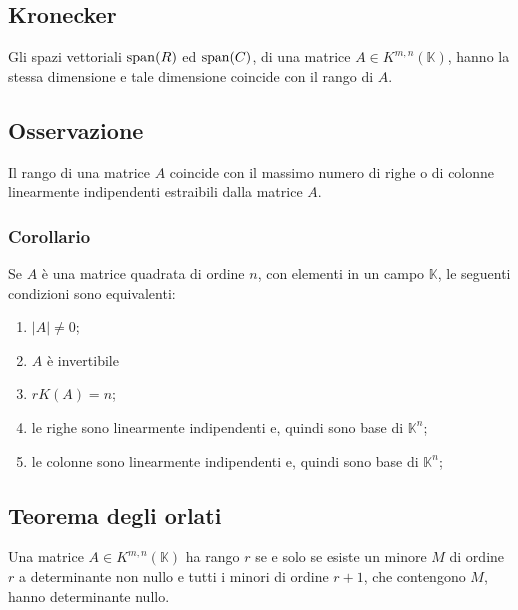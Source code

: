 \documentclass[../main.tex]{subfiles}
\begin{document}
\subsection{Kronecker}
Gli spazi vettoriali $\operatorname{span}(R)$ ed $\operatorname{span}(C)$, di una matrice $A\in K^{m,n}
    (\mathbb{K})$, hanno la stessa dimensione e tale dimensione coincide con il
rango di $A$.

\subsection{Osservazione}
Il rango di una matrice $A$ coincide con il massimo numero di righe o di
colonne linearmente indipendenti estraibili dalla matrice $A$.

\subsubsection{Corollario}
Se $A$ è una matrice quadrata di ordine $n$, con elementi in un campo
$\mathbb{K}$, le seguenti condizioni sono equivalenti:
\begin{enumerate}
    \item $|A|\ne0$;
    \item $A$ è invertibile
    \item $rK (A) = n$;
    \item le righe sono linearmente indipendenti e, quindi sono base di $\mathbb{K}^n$;
    \item le colonne sono linearmente indipendenti e, quindi sono base di $\mathbb{K}^n$;
\end{enumerate}

\subsection{Teorema degli orlati}
Una matrice $A\in K^{m,n} (\mathbb{K})$ ha rango $r$ se e solo se esiste un
minore $M$ di ordine $r$ a determinante non nullo e tutti i minori di ordine
$r+1$, che contengono $M$, hanno determinante nullo.
\end{document}
